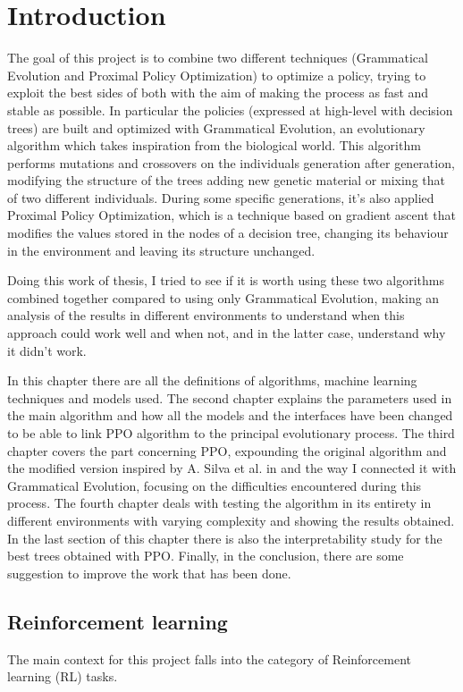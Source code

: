 \chapter{Introduction}
\label{cha:100}
The goal of this project is to combine two different techniques (Grammatical Evolution and Proximal Policy Optimization) to optimize a policy, trying to exploit the best sides of both with the aim of making the process as fast and stable as possible. In particular the policies (expressed at high-level with decision trees) are built and optimized with Grammatical Evolution, an evolutionary algorithm which takes inspiration from the biological world. This algorithm performs mutations and crossovers on the individuals generation after generation, modifying the structure of the trees adding new genetic material or mixing that of two different individuals. During some specific generations, it's also applied Proximal Policy Optimization, which is a technique based on gradient ascent that modifies the values stored in the nodes of a decision tree, changing its behaviour in the environment and leaving its structure unchanged.

Doing this work of thesis, I tried to see if it is worth using these two algorithms combined together compared to using only Grammatical Evolution, making an analysis of the results in different environments to understand when this approach could work well and when not, and in the latter case, understand why it didn't work.

In this chapter there are all the definitions of algorithms, machine learning techniques and models used. The second chapter explains the parameters used in the main algorithm and how all the models and the interfaces have been changed to be able to link PPO algorithm to the principal evolutionary process. The third chapter covers the part concerning PPO, expounding the original algorithm and the modified version inspired by A. Silva et al. in \cite{silva} and the way I connected it with Grammatical Evolution, focusing on the difficulties encountered during this process. The fourth chapter deals with testing the algorithm in its entirety in different environments with varying complexity and showing the results obtained. In the last section of this chapter there is also the interpretability study for the best trees obtained with PPO. Finally, in the conclusion, there are some suggestion to improve the work that has been done.


\section{Reinforcement learning}
\label{sec:110}
The main context for this project falls into the category of Reinforcement learning (RL) tasks.

